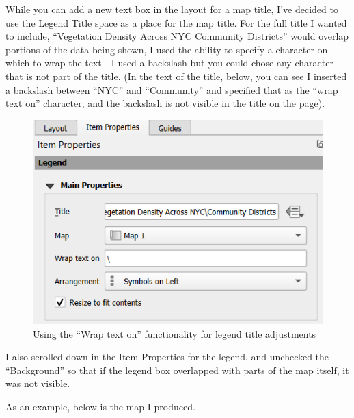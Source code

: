 \documentclass[
  letterpaper,
  DIV=11,
  numbers=noendperiod]{scrreprt}
\begin{document}
While you can add a new text box in the layout for a map title, I've
decided to use the Legend Title space as a place for the map title. For
the full title I wanted to include, ``Vegetation Density Across NYC
Community Districts'' would overlap portions of the data being shown, I
used the ability to specify a character on which to wrap the text - I
used a backslash but you could chose any character that is not part of
the title. (In the text of the title, below, you can see I inserted a
backslash between ``NYC'' and ``Community'' and specified that as the
``wrap text on'' character, and the backslash is not visible in the
title on the page).

\begin{figure}

{\centering \includegraphics{./images/LegendTitle.png}

}

\caption{Using the ``Wrap text on'' functionality for legend title
adjustments}

\end{figure}

I also scrolled down in the Item Properties for the legend, and
unchecked the ``Background'' so that if the legend box overlapped with
parts of the map itself, it was not visible.

As an example, below is the map I produced.
\end{document}
